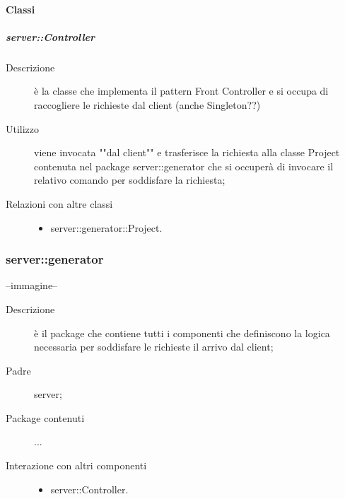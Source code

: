 \paragraph{Classi}
\subparagraph{server::Controller}
\begin{description}
\item[Descrizione] è la classe che implementa il pattern Front Controller e si occupa di raccogliere le richieste dal client (anche Singleton??)
\item[Utilizzo] viene invocata ""dal client"" e trasferisce la richiesta alla classe Project contenuta nel package server::generator che si occuperà di invocare il relativo comando per soddisfare la richiesta; 
\item[Relazioni con altre classi] 
	\begin{itemize}
	\item server::generator::Project.
	\end{itemize}
\end{description}

\subsubsection{server::generator}
--immagine--
\begin{description}
\item[Descrizione] è il package che contiene tutti i componenti che definiscono la logica necessaria per soddisfare le richieste il arrivo dal client;
\item[Padre] server; 
\item[Package contenuti]
	\begin{itemize}
	...
	\end{itemize}
\item[Interazione con altri componenti] 
	\begin{itemize}
	\item server::Controller.
	\end{itemize}
\end{description}
